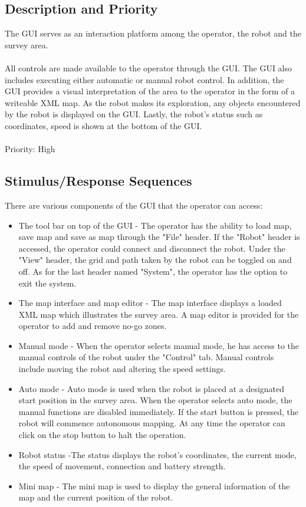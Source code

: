 \documentclass[11pt, a4paper]{report}
\begin{document}
\subsection {Description and Priority}
The GUI serves as an interaction platform among the operator, the robot and the survey area.\\ \\
All controls are made available to the operator through the GUI. The GUI also includes executing
either automatic or manual robot control. In addition, the GUI provides a visual interpretation of the area to the operator in the form of a writeable XML map. As the robot makes its exploration, any objects encountered by the robot is displayed on the GUI. Lastly, the robot's status such as coordinates, speed is shown at the bottom of the GUI.\\ \\
Priority: High


\subsection{Stimulus/Response Sequences}

There are various components of the GUI that the operator can access:

\begin{itemize}
	\item The tool bar on top of the GUI - The operator has the ability to load map, save map and save as map through the "File" header. If the "Robot" header is accessed, the operator could connect and disconnect the robot. Under the "View" header, the grid and path taken by the robot can be toggled on and off. As for the last header named "System", the operator has the option to exit the system.
	\item The map interface and map editor - The map interface displays a loaded XML map which illustrates the survey area. A map editor is provided for the operator to add and remove no-go zones. 
	\item Manual mode - When the operator selects manual mode, he has access to the manual controls of the robot under the "Control" tab. Manual controls include moving the robot and altering the speed settings. 
	\item  Auto mode - Auto mode is used when the robot is placed at a designated start position in the survey area. When the operator selects auto mode, the manual functions are disabled immediately. If the start button is pressed, the robot will commence autonomous mapping. At any time the operator can click on the stop button to halt the operation. 
	\item Robot status -The status displays the robot's coordinates, the current mode, the speed of movement, connection and battery strength.
	\item Mini map - The mini map is used to display the general information of the map and the current position of the robot.
\end{itemize}
\end{document}
